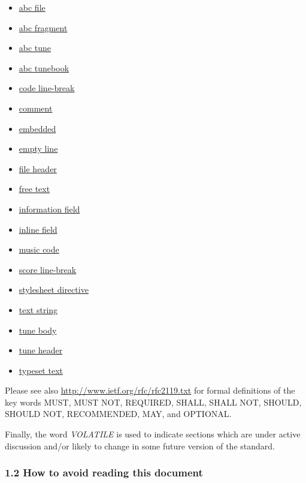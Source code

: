 \begin{itemize}
\item
  \protect\hyperlink{abc_file_definition}{abc file}
\item
  \protect\hyperlink{abc_fragment_definition}{abc fragment}
\item
  \protect\hyperlink{abc_tune_definition}{abc tune}
\item
  \protect\hyperlink{abc_tunebook_definition}{abc tunebook}
\item
  \protect\hyperlink{code_line-break_definition}{code line-break}
\item
  \protect\hyperlink{comment_definition}{comment}
\item
  \protect\hyperlink{embedded_definition}{embedded}
\item
  \protect\hyperlink{empty_line_definition}{empty line}
\item
  \protect\hyperlink{file_header_definition}{file header}
\item
  \protect\hyperlink{free_text_definition}{free text}
\item
  \protect\hyperlink{information_field_definition}{information field}
\item
  \protect\hyperlink{inline_field_definition}{inline field}
\item
  \protect\hyperlink{music_code_definition}{music code}
\item
  \protect\hyperlink{score_line-break_definition}{score line-break}
\item
  \protect\hyperlink{stylesheet_directive_definition}{stylesheet
  directive}
\item
  \protect\hyperlink{text_string_definition}{text string}
\item
  \protect\hyperlink{tune_body_definition}{tune body}
\item
  \protect\hyperlink{tune_header_definition}{tune header}
\item
  \protect\hyperlink{typeset_text_definition}{typeset text}
\end{itemize}

Please see also \url{http://www.ietf.org/rfc/rfc2119.txt} for formal
definitions of the key words MUST, MUST NOT, REQUIRED, SHALL, SHALL NOT,
SHOULD, SHOULD NOT, RECOMMENDED, MAY, and OPTIONAL.

Finally, the word \emph{VOLATILE} is used to indicate sections which are
under active discussion and/or likely to change in some future version
of the standard.

\hypertarget{how_to_avoid_reading_this_document}{\subsubsection{1.2 How
to avoid reading this
document}\label{how_to_avoid_reading_this_document}}

